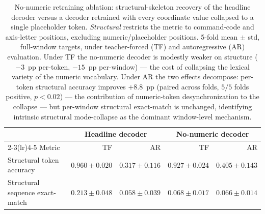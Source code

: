 \begin{table}[ht]
\centering
\caption{No-numeric retraining ablation: structural-skeleton recovery of the
headline decoder versus a decoder retrained with every coordinate value
collapsed to a single placeholder token. \emph{Structural} restricts the
metric to command-code and axis-letter positions, excluding
numeric/placeholder positions. 5-fold mean $\pm$ std, full-window targets,
under teacher-forced (TF) and autoregressive (AR) evaluation. Under TF the
no-numeric decoder is modestly weaker on structure ($-3$~pp per-token,
$-15$~pp per-window) --- the cost of collapsing the lexical variety of the
numeric vocabulary. Under AR the two effects decompose: per-token structural
accuracy improves $+8.8$~pp (paired across folds, $5/5$ folds positive,
$p\!<\!0.02$) --- the contribution of numeric-token desynchronization to the
collapse --- but per-window structural exact-match is unchanged, identifying
intrinsic structural mode-collapse as the dominant window-level mechanism.}
\label{tab:nonumeric}
\begin{tabular}{l r r r r}
\toprule
 & \multicolumn{2}{c}{Headline decoder} & \multicolumn{2}{c}{No-numeric decoder} \\
\cmidrule(lr){2-3}\cmidrule(lr){4-5}
Metric & TF & AR & TF & AR \\
\midrule
Structural token accuracy      & $0.960 \pm 0.020$ & $0.317 \pm 0.116$ & $0.927 \pm 0.024$ & $0.405 \pm 0.143$ \\
Structural sequence exact-match & $0.213 \pm 0.048$ & $0.058 \pm 0.039$ & $0.068 \pm 0.017$ & $0.066 \pm 0.014$ \\
\bottomrule
\end{tabular}
\end{table}
